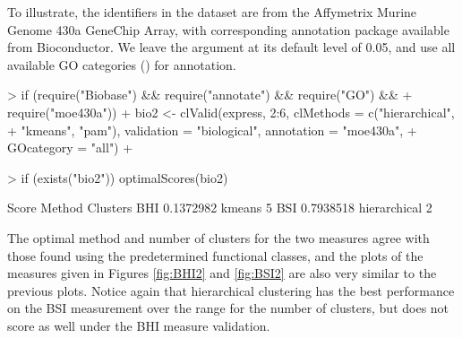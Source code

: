 \documentclass[11pt]{article}
\begin{document}
To illustrate, the identifiers in the dataset  are from the
Affymetrix Murine Genome 430a GeneChip Array, with corresponding
annotation package  available from Bioconductor.  We
leave the  argument at its default level of 0.05,
and use all available GO categories () for annotation.

\begin{Schunk}
\begin{Sinput}
> if (require("Biobase") && require("annotate") && require("GO") && 
+     require("moe430a")) {
+     bio2 <- clValid(express, 2:6, clMethods = c("hierarchical", 
+         "kmeans", "pam"), validation = "biological", annotation = "moe430a", 
+         GOcategory = "all")
+ }
\end{Sinput}
\end{Schunk}

\begin{Schunk}
\begin{Sinput}
> if (exists("bio2")) optimalScores(bio2)
\end{Sinput}
\begin{Soutput}
        Score       Method Clusters
BHI 0.1372982       kmeans        5
BSI 0.7938518 hierarchical        2
\end{Soutput}
\end{Schunk}

The optimal method and number of clusters for the two measures agree
with those found using the predetermined functional classes, and the   
plots of the measures given in Figures \ref{fig:BHI2} and
\ref{fig:BSI2} are also very similar to the previous plots.
Notice again that hierarchical clustering has the best performance on
the BSI measurement over the range for the number of clusters, 
but does not score as well under the BHI measure validation.  
\end{document}
